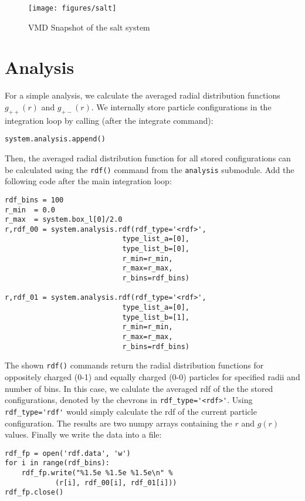 \documentclass[
a4paper,                        %
11pt,                           %
twoside,                        %
footsepline,                    %
headsepline,                    %
headexclude,                    %
footexclude,                    %
pagesize,                       %
]{scrartcl}
\begin{document}
\begin{figure}[tb]
  \centering
  \texttt{[image: figures/salt]}
  \caption{VMD Snapshot of the salt system}
  \label{fig:snapshot}
\end{figure}

\section{Analysis}

For a simple analysis, we calculate the averaged radial distribution functions
$g_{++}(r)$ and $g_{+-}(r)$. We internally store particle configurations in the
integration loop by calling (after the integrate command):

\begin{lstlisting}
system.analysis.append()
\end{lstlisting}

Then, the averaged radial distribution function for all stored configurations
can be calculated using the \verb|rdf()| command from the \verb|analysis|
submodule. Add the following code after the main integration loop:

\begin{lstlisting}
rdf_bins = 100
r_min  = 0.0
r_max  = system.box_l[0]/2.0
r,rdf_00 = system.analysis.rdf(rdf_type='<rdf>', 
                            type_list_a=[0],
                            type_list_b=[0], 
                            r_min=r_min,
                            r_max=r_max, 
                            r_bins=rdf_bins)

r,rdf_01 = system.analysis.rdf(rdf_type='<rdf>', 
                            type_list_a=[0],
                            type_list_b=[1], 
                            r_min=r_min,
                            r_max=r_max, 
                            r_bins=rdf_bins)
\end{lstlisting}

The shown \verb|rdf()| commands return the radial distribution functions for
oppositely charged (0-1) and equally charged (0-0) particles for specified radii
and number of bins. In this case, we calulate the averaged rdf of the the stored
configurations, denoted by the chevrons in \verb|rdf_type='<rdf>'|. Using
\verb|rdf_type='rdf'| would simply calculate the rdf of the current particle
configuration. The results are two numpy arrays containing the $r$ and $g(r)$
values. Finally we write the data into a file:

\begin{lstlisting}
rdf_fp = open('rdf.data', 'w')
for i in range(rdf_bins):
    rdf_fp.write("%1.5e %1.5e %1.5e\n" % 
            (r[i], rdf_00[i], rdf_01[i]))
rdf_fp.close()
\end{lstlisting}
\end{document}
